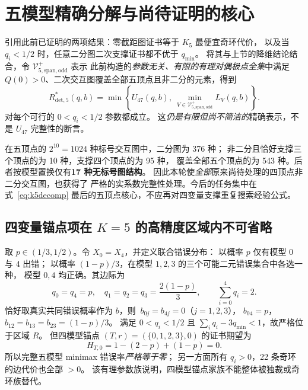 \documentclass[11pt,a4paper]{ctexart}
\theoremstyle{remark}\newtheorem{remark}[theorem]{备注}
\newcommand{\Rstar}[1]{R^*_{\mathrm{det},#1}}
\begin{document}
\section{五模型精确分解与尚待证明的核心}
引用此前已证明的两项结果：零截距图证书等于 $K_5$ 最便宜奇环代价，
以及当 $q_i<1/2$ 时，任意二分图二次支撑证书都不优于 $q_{\min}$。
将其与上节的降维结论结合，令 $\mathcal V_{5,\mathrm{span,odd}}^+$ 表示
此前构造的\emph{参数无关、有限的有理对偶极点全集}中满足
$Q(0)>0$、二次交互图覆盖全部五顶点且非二分的元素，得到
\begin{equation}\label{eq:k5decomp}
\boxed{
\Rstar{5}(q,b)=\min\left\{
U_{47}(q,b),\ 
\min_{V\in\mathcal V_{5,\mathrm{span,odd}}^+}L_V(q,b)
\right\}.}
\end{equation}
对每个可行的 $0<q_i<1/2$ 参数都成立。
这\emph{仍是有限但尚不简洁的}精确表示，不是 $U_{47}$ 完整性的断言。

在五顶点的 $2^{10}=1024$ 种标号交互图中，二分图为 376 种；
非二分且恰好支撑三个顶点的为 10 种，支撑四个顶点的为 95 种，
覆盖全部五个顶点的为 543 种。后者按模型置换仅有\textbf{17 种无标号图结构}。
因此本轮使\emph{全部}原来尚待处理的四顶点非二分交互图，也获得了
严格的实系数完整性处理。今后的任务集中在式~\eqref{eq:k5decomp}
最后的五顶点核心，不应再对四变量支撑重复搜索经验公式。

\subsection{四变量锚点项在 $K=5$ 的高精度区域内不可省略}
取 $p\in(1/3,1/2)$。令 $X_0=X_4$，并定义联合错误分布：
以概率 $p$ 仅有模型 $0$ 与 $4$ 出错；
以概率 $(1-p)/3$，在模型 $1,2,3$ 的三个可能二元错误集合中各选一种，
模型 $0,4$ 均正确。其边际为
\[
q_0=q_4=p,\quad
q_1=q_2=q_3=\frac{2(1-p)}3,\qquad
\sum_{i=0}^4q_i=2.
\]
恰好取真实共同错误概率作为 $b$，则
$\ b_{0j}=b_{4j}=0$（$j=1,2,3$），
$b_{04}=p$，
$b_{12}=b_{13}=b_{23}=(1-p)/3$。
满足 $0<q_i<1/2$ 且
$\sum_iq_i-3q_{\min}<1$，故严格位于区域 $R$。
但四模型锚点 $(T,r)=(\{0,1,2,3\},0)$ 的证书期望为
\[
H_{T,0}=1-(2-p)+(1-p)=0.
\]
所以完整五模型 minimax 错误率\emph{严格等于零}；
另一方面所有 $q_i>0$，22 条奇环的边代价也全部 $>0$。
该有理参数族说明，四模型锚点家族不能整体被独裁或奇环族替代。
\end{document}
